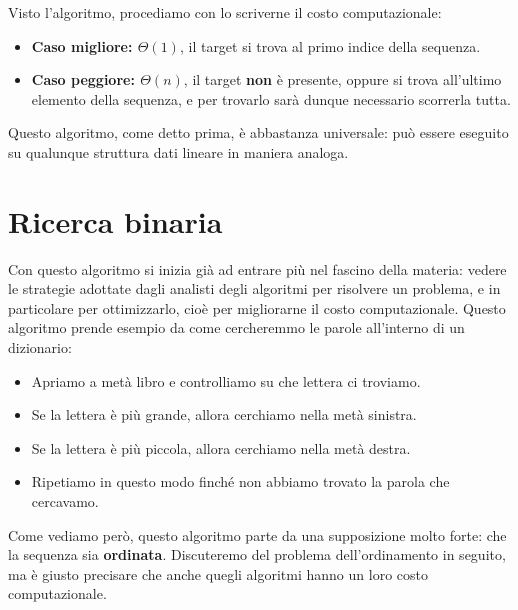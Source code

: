 \documentclass[12pt]{report}
\begin{document}
	Visto l'algoritmo, procediamo con lo scriverne il costo computazionale:
	\begin{itemize}
		
    	\item \textbf{Caso migliore: $\Theta(1)$}, il target si trova al primo indice della sequenza.
    	
    	\item \textbf{Caso peggiore: $\Theta(n)$}, il target \textbf{non} è presente, oppure si trova all'ultimo elemento della sequenza, e per trovarlo sarà dunque necessario scorrerla tutta.
    	
    \end{itemize}
    		
	Questo algoritmo, come detto prima, è abbastanza universale: può essere eseguito su qualunque struttura dati lineare in maniera analoga.    
    	
	\section{Ricerca binaria}
    Con questo algoritmo si inizia già ad entrare più nel fascino della materia: vedere le strategie adottate dagli analisti degli algoritmi per risolvere un problema, e in particolare per ottimizzarlo, cioè per migliorarne il costo computazionale.
    Questo algoritmo prende esempio da come cercheremmo le parole all’interno di un dizionario:
    \begin{itemize}
    	
    	\item Apriamo a metà libro e controlliamo su che lettera ci troviamo.
    	
    	\item Se la lettera è più grande, allora cerchiamo nella metà sinistra.
    	
    	\item Se la lettera è più piccola, allora cerchiamo nella metà destra.
    	
    	\item Ripetiamo in questo modo finché non abbiamo trovato la parola che cercavamo.
    		
    	\end{itemize}
    	
    Come vediamo però, questo algoritmo parte da una supposizione molto forte: che la sequenza sia \textbf{ordinata}. Discuteremo del problema dell’ordinamento in seguito, ma è giusto precisare che anche quegli algoritmi hanno un loro costo computazionale.
    		
\end{document}
